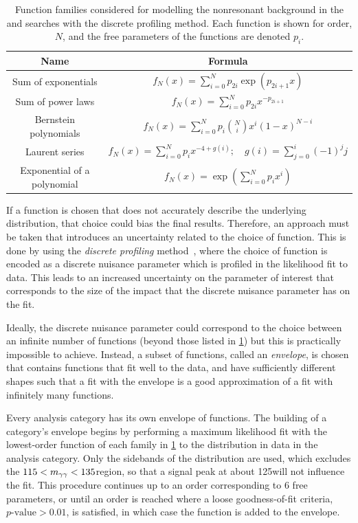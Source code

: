 \begin{table}
  \caption[Function Families Used to Model the Nonresonant Background in the \XHH and \XYttHgg Searches]{Function families considered for modelling the nonresonant background in the \XHH and \XYttHgg searches with the discrete profiling method. Each function is shown for order, $N$, and the free parameters of the functions are denoted $p_i$.}\label{tab:bmodel_functions}
  \centering
  \renewcommand{\arraystretch}{2}
  \begin{tabular}{cc}
    \toprule
    Name & Formula \\
    \midrule
    Sum of exponentials & $f_N(x) = \sum^N_{i=0} p_{2i} \exp(p_{2i+1}x)$ \\
    Sum of power laws & $f_N(x) = \sum^N_{i=0} p_{2i}x^{-p_{2i+1}}$ \\
    Bernstein polynomials & $f_N(x) = \sum^N_{i=0} p_i {N \choose i}x^i(1-x)^{N-i}$ \\
    Laurent series & $f_N(x) = \sum^N_{i=0} p_i x^{-4+g(i)}; \quad g(i) = \sum^i_{j=0} (-1)^j j$ \\
    Exponential of a polynomial & $ f_N(x) = \exp\left(\sum_{i=0}^N p_i x^i\right)$ \\
    \bottomrule
  \end{tabular}
\end{table}

If a function is chosen that does not accurately describe the underlying \mgg distribution, that choice could bias the final results. Therefore, an approach must be taken that introduces an uncertainty related to the choice of function. This is done by using the \textit{discrete profiling} method~\cite{Dauncey:2014xga}, where the choice of function is encoded as a discrete nuisance parameter which is profiled in the likelihood fit to data. This leads to an increased uncertainty on the parameter of interest that corresponds to the size of the impact that the discrete nuisance parameter has on the fit. 

Ideally, the discrete nuisance parameter could correspond to the choice between an infinite number of functions (beyond those listed in \cref{tab:bmodel_functions}) but this is practically impossible to achieve. Instead, a subset of functions, called an \textit{envelope}, is chosen that contains functions that fit well to the data, and have sufficiently different shapes such that a fit with the envelope is a good approximation of a fit with infinitely many functions.

Every analysis category has its own envelope of functions. The building of a category's envelope begins by performing a maximum likelihood fit with the lowest-order function of each family in \cref{tab:bmodel_functions} to the \mgg distribution in data in the analysis category. Only the sidebands of the \mgg distribution are used, which excludes the $115 < m_{\gamma\gamma} < 135$\GeV region, so that a signal peak at about 125\GeV will not influence the fit.  This procedure continues up to an order corresponding to 6 free parameters, or until an order is reached where a loose goodness-of-fit criteria, $p\text{-value}>0.01$, is satisfied, in which case the function is added to the envelope.

